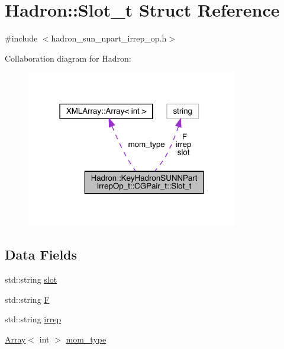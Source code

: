 \hypertarget{structHadron_1_1KeyHadronSUNNPartIrrepOp__t_1_1CGPair__t_1_1Slot__t}{}\section{Hadron\+:\+:Slot\+\_\+t Struct Reference}
\label{structHadron_1_1KeyHadronSUNNPartIrrepOp__t_1_1CGPair__t_1_1Slot__t}


{\ttfamily \#include $<$hadron\+\_\+sun\+\_\+npart\+\_\+irrep\+\_\+op.\+h$>$}



Collaboration diagram for Hadron\+:\nopagebreak
\begin{figure}[H]
\begin{center}
\leavevmode
\includegraphics[width=262pt]{d2/dfb/structHadron_1_1KeyHadronSUNNPartIrrepOp__t_1_1CGPair__t_1_1Slot__t__coll__graph}
\end{center}
\end{figure}
\subsection*{Data Fields}
\begin{DoxyCompactItemize}
\item 
std\+::string \mbox{\hyperlink{structHadron_1_1KeyHadronSUNNPartIrrepOp__t_1_1CGPair__t_1_1Slot__t_aac0f3ecb03784adb64cac8f9960608bd}{slot}}
\item 
std\+::string \mbox{\hyperlink{structHadron_1_1KeyHadronSUNNPartIrrepOp__t_1_1CGPair__t_1_1Slot__t_a89b8fcca65f81d280a0400e839c42298}{F}}
\item 
std\+::string \mbox{\hyperlink{structHadron_1_1KeyHadronSUNNPartIrrepOp__t_1_1CGPair__t_1_1Slot__t_a55c1ea469ec22681f2de67cd4590279a}{irrep}}
\item 
\mbox{\hyperlink{classXMLArray_1_1Array}{Array}}$<$ int $>$ \mbox{\hyperlink{structHadron_1_1KeyHadronSUNNPartIrrepOp__t_1_1CGPair__t_1_1Slot__t_a7b969835acc00412fa13ec3f8147402c}{mom\+\_\+type}}
\end{DoxyCompactItemize}


